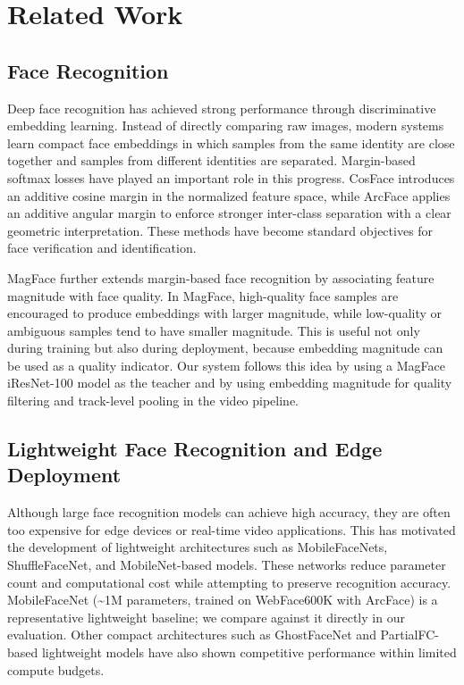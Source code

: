 \section{Related Work}
\subsection{Face Recognition}

Deep face recognition has achieved strong performance through discriminative embedding learning. Instead of directly comparing raw images, modern systems learn compact face embeddings in which samples from the same identity are close together and samples from different identities are separated. Margin-based softmax losses have played an important role in this progress. CosFace introduces an additive cosine margin in the normalized feature space, while ArcFace applies an additive angular margin to enforce stronger inter-class separation with a clear geometric interpretation\cite{cosface}\cite{arcface}. These methods have become standard objectives for face verification and identification.

MagFace further extends margin-based face recognition by associating feature magnitude with face quality\cite{magface}. In MagFace, high-quality face samples are encouraged to produce embeddings with larger magnitude, while low-quality or ambiguous samples tend to have smaller magnitude. This is useful not only during training but also during deployment, because embedding magnitude can be used as a quality indicator. Our system follows this idea by using a MagFace iResNet-100 model as the teacher and by using embedding magnitude for quality filtering and track-level pooling in the video pipeline.

\subsection{Lightweight Face Recognition and Edge Deployment}

Although large face recognition models can achieve high accuracy, they are often too expensive for edge devices or real-time video applications. This has motivated the development of lightweight architectures such as MobileFaceNets, ShuffleFaceNet, and MobileNet-based models. These networks reduce parameter count and computational cost while attempting to preserve recognition accuracy\cite{mobilefacenets}. MobileFaceNet (\textasciitilde1M parameters, trained on WebFace600K with ArcFace) is a representative lightweight baseline; we compare against it directly in our evaluation. Other compact architectures such as GhostFaceNet and PartialFC-based lightweight models have also shown competitive performance within limited compute budgets.

